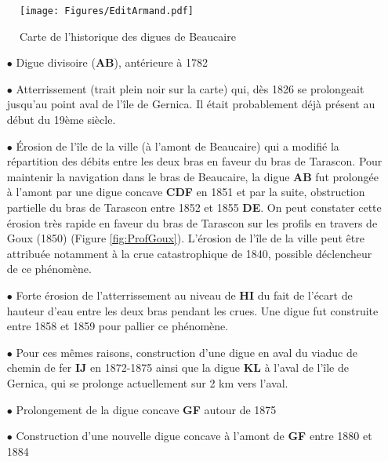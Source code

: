 \documentclass[11pt]{article}
\begin{document}
         \begin{figure}[h]
            \centering
            \texttt{[image: Figures/EditArmand.pdf]}
            \caption{Carte de l'historique des digues de Beaucaire \citep{armand_ii_1907}}
            \label{fig:DigArmand}
        \end{figure}
        
        \begin{itemize}
            \item[$\bullet$] Digue divisoire (\textbf{AB}), antérieure à 1782
            \item[$\bullet$] Atterrissement (trait plein noir sur la carte) qui, dès 1826 se prolongeait jusqu'au point aval de l'île de Gernica. Il était probablement déjà présent au début du 19ème siècle.
            \item[$\bullet$] Érosion de l'île de la ville (à l'amont de Beaucaire) qui a modifié la répartition des débits entre les deux bras en faveur du bras de Tarascon. Pour maintenir la navigation dans le bras de Beaucaire, la digue \textbf{AB} fut prolongée à l'amont par une digue concave \textbf{CDF} en 1851 et par la suite, obstruction partielle du bras de Tarascon entre 1852 et 1855 \textbf{DE}. On peut constater cette érosion très rapide en faveur du bras de Tarascon sur les profils en travers de Goux (1850) (Figure \ref{fig:ProfGoux}). L'érosion de l'île de la ville peut être attribuée notamment à la crue catastrophique de 1840, possible déclencheur de ce phénomène.
            \item[$\bullet$] Forte érosion de l'atterrissement au niveau de \textbf{HI} du fait de l'écart de hauteur d'eau entre les deux bras pendant les crues. Une digue fut construite entre 1858 et 1859 pour pallier ce phénomène.
            \item[$\bullet$] Pour ces mêmes raisons, construction d'une digue en aval du viaduc de chemin de fer \textbf{IJ} en 1872-1875 ainsi que la digue \textbf{KL} à l'aval de l'île de Gernica, qui se prolonge actuellement sur 2 km vers l'aval.
            \item[$\bullet$] Prolongement de la digue concave \textbf{GF} autour de 1875
            \item[$\bullet$] Construction d'une nouvelle digue concave à l'amont de \textbf{GF} entre 1880 et 1884
        \end{itemize}
\end{document}
